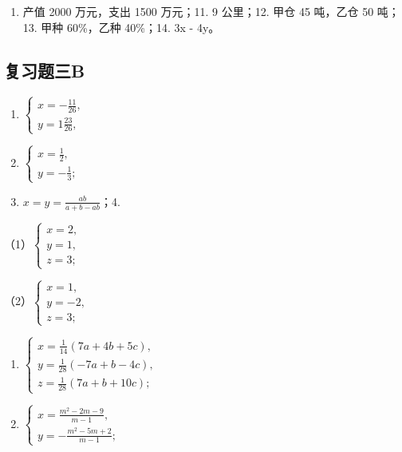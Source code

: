 \begin{enumerate}[start=10]
\item
  产值 2000 万元，支出 1500 万元；11. 9 公里；12. 甲仓 45 吨，乙仓 50
  吨；13. 甲种 60\%，乙种 40\%；14. 3x - 4y。
\end{enumerate}

\subsection{复习题三B}

\begin{enumerate}[start=1]
\item
  \(\left\{ \begin{array}{l} x = -\frac{11}{26}, \\ y = 1\frac{23}{26}, \end{array} \right.\)
\item
  \(\left\{ \begin{array}{l} x = \frac{1}{2}, \\ y = -\frac{1}{3}; \end{array} \right.\)
\item
  \(x = y = \frac{ab}{a + b - ab}\)；4.
\end{enumerate}
（1）\(\left\{ \begin{array}{l} x = 2, \\ y = 1, \\ z = 3; \end{array} \right.\)

（2）\(\left\{ \begin{array}{l} x = 1, \\ y = -2, \\ z = 3; \end{array} \right.\)
\begin{enumerate}[start=5]
\item
  \(\left\{ \begin{array}{l} x = \frac{1}{14} (7a + 4b + 5c), \\ y = \frac{1}{28} (-7a + b - 4c), \\ z = \frac{1}{28} (7a + b + 10c); \end{array} \right.\)
\item
  \(\left\{ \begin{array}{l} x = \frac{m^2 - 2m - 9}{m - 1}, \\ y = -\frac{m^2 - 5m + 2}{m - 1}; \end{array} \right.\)
\end{enumerate}


